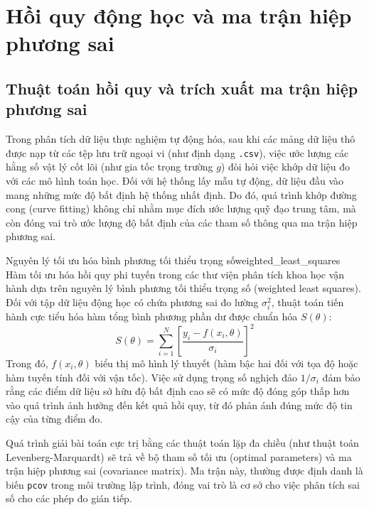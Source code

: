 \chapter{Hồi quy động học và ma trận hiệp phương sai}
\section{Thuật toán hồi quy và trích xuất ma trận hiệp phương sai}
\label{sec:theory_pcov}

Trong phân tích dữ liệu thực nghiệm tự động hóa, sau khi các mảng dữ liệu thô được nạp từ các tệp lưu trữ ngoại vi (như định dạng \texttt{.csv}), việc ước lượng các hằng số vật lý cốt lõi (như gia tốc trọng trường $g$) đòi hỏi việc khớp dữ liệu đo với các mô hình toán học. Đối với hệ thống lấy mẫu tự động, dữ liệu đầu vào mang những mức độ bất định hệ thống nhất định. Do đó, quá trình khớp đường cong (curve fitting) không chỉ nhằm mục đích ước lượng quỹ đạo trung tâm, mà còn đóng vai trò ước lượng độ bất định của các tham số thông qua ma trận hiệp phương sai.

\begin{physcore}{Nguyên lý tối ưu hóa bình phương tối thiểu trọng số}{weighted_least_squares}
Hàm tối ưu hóa hồi quy phi tuyến trong các thư viện phân tích khoa học vận hành dựa trên nguyên lý bình phương tối thiểu trọng số (weighted least squares). Đối với tập dữ liệu động học có chứa phương sai đo lường $\sigma_i^2$, thuật toán tiến hành cực tiểu hóa hàm tổng bình phương phần dư được chuẩn hóa $S(\theta)$:
\begin{equation}
    S(\theta) = \sum_{i=1}^{N} \left[ \frac{y_i - f(x_i, \theta)}{\sigma_i} \right]^2 \label{eq:weighted_least_squares}
\end{equation}
Trong đó, $f(x_i, \theta)$ biểu thị mô hình lý thuyết (hàm bậc hai đối với tọa độ hoặc hàm tuyến tính đối với vận tốc). Việc sử dụng trọng số nghịch đảo $1/\sigma_i$ đảm bảo rằng các điểm dữ liệu sở hữu độ bất định cao sẽ có mức độ đóng góp thấp hơn vào quá trình ảnh hưởng đến kết quả hồi quy, từ đó phản ánh đúng mức độ tin cậy của từng điểm đo.
\end{physcore}

Quá trình giải bài toán cực trị bằng các thuật toán lặp đa chiều (như thuật toán Levenberg-Marquardt) sẽ trả về bộ tham số tối ưu (optimal parameters) và ma trận hiệp phương sai (covariance matrix). Ma trận này, thường được định danh là biến \texttt{pcov} trong môi trường lập trình, đóng vai trò là cơ sở cho việc phân tích sai số cho các phép đo gián tiếp.

